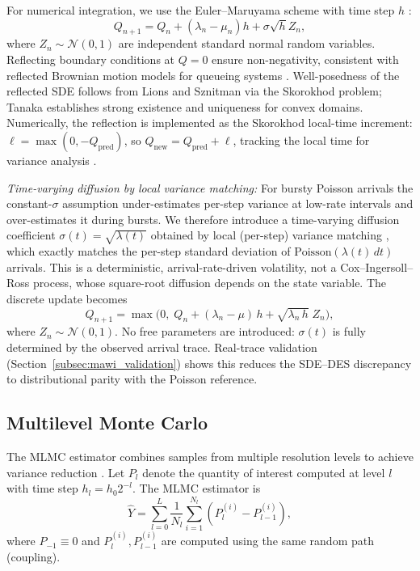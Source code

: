 \documentclass{ieeeaccess}
\begin{document}
For numerical integration, we use the Euler--Maruyama scheme with time step $h$
\cite{kloeden1992}:
\begin{equation}
    Q_{n+1} = Q_n + (\lambda_n - \mu_n)h + \sigma\sqrt{h}Z_n ,
    \label{eq:euler}
\end{equation}
where $Z_n \sim \mathcal{N}(0,1)$ are independent standard normal random variables. Reflecting
boundary conditions at $Q=0$ ensure non-negativity, consistent with reflected Brownian motion
models for queueing systems \cite{harrison1985,lions1984stochastic,tanaka1979stochastic}.
Well-posedness of the reflected SDE follows from Lions and Sznitman \cite{lions1984stochastic}
via the Skorokhod problem; Tanaka \cite{tanaka1979stochastic} establishes strong existence and
uniqueness for convex domains. Numerically, the reflection is implemented as the Skorokhod
local-time increment: $\ell = \max(0, -Q_{\mathrm{pred}})$, so $Q_{\mathrm{new}} = Q_{\mathrm{pred}}
+ \ell$, tracking the local time for variance analysis \cite{asmussen2007stochastic}.

\textit{Time-varying diffusion by local variance matching:}
For bursty Poisson arrivals the constant-$\sigma$ assumption under-estimates per-step variance
at low-rate intervals and over-estimates it during bursts. We therefore introduce a
time-varying diffusion coefficient $\sigma(t)=\sqrt{\lambda(t)}$ obtained by local (per-step)
variance matching \cite{kang2007}, which exactly matches the
per-step standard deviation of $\mathrm{Poisson}(\lambda(t)\,dt)$ arrivals. This is a
deterministic, arrival-rate-driven volatility, not a Cox--Ingersoll--Ross process, whose
square-root diffusion depends on the state variable. The discrete update
becomes
\begin{equation}
    Q_{n+1} = \max\!\bigl(0,\; Q_n + (\lambda_n - \mu)\,h + \sqrt{\lambda_n\,h}\;Z_n\bigr),
    \label{eq:tv_sigma}
\end{equation}
where $Z_n \sim \mathcal{N}(0,1)$. No free parameters are introduced: $\sigma(t)$ is fully
determined by the observed arrival trace. Real-trace validation
(Section~\ref{subsec:mawi_validation}) shows this reduces the SDE--DES discrepancy to
distributional parity with the Poisson reference.

\subsection{Multilevel Monte Carlo}

The MLMC estimator combines samples from multiple resolution levels to achieve variance reduction
\cite{giles2008multilevel,giles2015multilevel}. Let $P_l$ denote the quantity of interest
computed at level $l$ with time step $h_l = h_0 2^{-l}$. The MLMC estimator is
\begin{equation}
    \hat{Y} = \sum_{l=0}^{L} \frac{1}{N_l} \sum_{i=1}^{N_l}
    \left(P_l^{(i)} - P_{l-1}^{(i)}\right),
    \label{eq:mlmc}
\end{equation}
where $P_{-1} \equiv 0$ and $P_l^{(i)}, P_{l-1}^{(i)}$ are computed using the same random path
(coupling).
\end{document}
